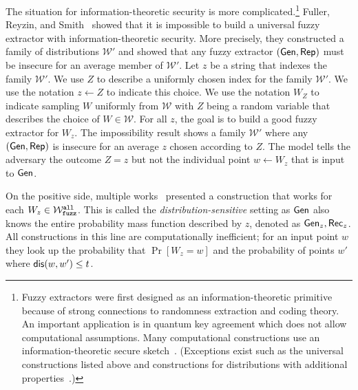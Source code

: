 The situation for information-theoretic security is more
complicated.\footnote{Fuzzy extractors were first designed as an
  information-theoretic primitive because of strong connections to
  randomness extraction and coding theory.  An important application is in quantum key agreement which does not allow computational assumptions.  Many computational
  constructions use an information-theoretic secure
  sketch~\cite{wen2018robustly,wen2019generic}.  (Exceptions exist
  such as the universal constructions listed above and constructions
  for distributions with additional
  properties~\cite{apon2017efficient,alamelou2018pseudoentropic,fuller2020computational,canetti2021reusable}.)
}  Fuller, Reyzin, and Smith~\cite{fuller2020fuzzy} showed that it is
impossible to build a universal fuzzy extractor with
information-theoretic security.  More precisely, they constructed a
family of distributions $\mathcal{W}'$ and showed that any
fuzzy extractor $({\mathsf{Gen}}, {\mathsf{Rep}})$ must be insecure for an average member
of $\mathcal{W}'$. Let $z$ be a string that indexes the family $\mathcal{W}'$. We use $Z$ to describe a uniformly chosen index for
the family $\mathcal{W'}$.  We use the notation $z\leftarrow Z$ to indicate this choice. We use the notation $W_Z$ to indicate sampling $W$ uniformly from $\mathcal{W}$ with $Z$ being a random variable that describes the choice of $W\in\mathcal{W}$. For all $z$, the goal is to build a good fuzzy extractor for $W_z$.  The impossibility result shows a family $\mathcal{W}'$ where any $({\mathsf{Gen}}, {\mathsf{Rep}})$ is insecure for an average $z$ chosen according to $Z$.  The model tells the adversary the outcome $Z=z$ but not the
individual point $w\leftarrow W_z$ that is input to ${\mathsf{Gen}}$.

On the positive side, multiple works~\cite{hayashi2014secret,hayashi2016secret,fuller2016fuzzy,woodage2017new,tyagi2017universal,TVW18,LA18,fuller2019continuous,fuller2020fuzzy} presented a construction that works for each $W_z\in \mathcal{W}_{\mathtt{fuzz}}^{\mathtt{all}}$.  This is called the \emph{distribution-sensitive} setting as ${\mathsf{Gen}}$ also knows the entire probability mass function described by $z$, denoted as ${\mathsf{Gen}}_{z}, {\mathsf{Rec}}_{z}$.  All constructions in this line are computationally inefficient; for an input point $w$ they look up the probability that $\Pr[W_z=w]$ and the probability of points $w'$ where $\mathsf{dis}(w, w')\le t$.  

